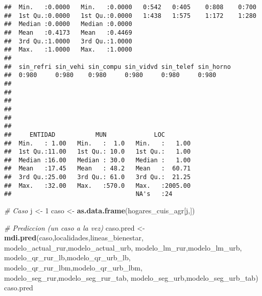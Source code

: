 \documentclass[11pt,]{article}
\newenvironment{Shaded}{\begin{snugshade}}{\end{snugshade}}
\newcommand{\KeywordTok}[1]{\textcolor[rgb]{0.13,0.29,0.53}{\textbf{#1}}}
\newcommand{\DecValTok}[1]{\textcolor[rgb]{0.00,0.00,0.81}{#1}}
\newcommand{\StringTok}[1]{\textcolor[rgb]{0.31,0.60,0.02}{#1}}
\newcommand{\CommentTok}[1]{\textcolor[rgb]{0.56,0.35,0.01}{\textit{#1}}}
\newcommand{\NormalTok}[1]{#1}
\begin{document}
\begin{verbatim}
##  Min.   :0.0000   Min.   :0.0000   0:542   0:405    0:808    0:700      
##  1st Qu.:0.0000   1st Qu.:0.0000   1:438   1:575    1:172    1:280      
##  Median :0.0000   Median :0.0000                                        
##  Mean   :0.4173   Mean   :0.4469                                        
##  3rd Qu.:1.0000   3rd Qu.:1.0000                                        
##  Max.   :1.0000   Max.   :1.0000                                        
##                                                                         
##  sin_refri sin_vehi sin_compu sin_vidvd sin_telef sin_horno
##  0:980     0:980    0:980     0:980     0:980     0:980    
##                                                            
##                                                            
##                                                            
##                                                            
##                                                            
##                                                            
##     ENTIDAD           MUN             LOC         
##  Min.   : 1.00   Min.   :  1.0   Min.   :   1.00  
##  1st Qu.:11.00   1st Qu.: 10.0   1st Qu.:   1.00  
##  Median :16.00   Median : 30.0   Median :   1.00  
##  Mean   :17.45   Mean   : 48.2   Mean   :  60.71  
##  3rd Qu.:25.00   3rd Qu.: 61.0   3rd Qu.:  21.25  
##  Max.   :32.00   Max.   :570.0   Max.   :2005.00  
##                                  NA's   :24
\end{verbatim}

\begin{Shaded}
\begin{Highlighting}[]
\CommentTok{# Caso}
\NormalTok{j <-}\StringTok{ }\DecValTok{1}
\NormalTok{caso <-}\StringTok{ }\KeywordTok{as.data.frame}\NormalTok{(hogares_cuis_agr[j,])}

\CommentTok{# Prediccion (un caso a la vez)}
\NormalTok{caso.pred <-}\StringTok{ }\KeywordTok{mdi.pred}\NormalTok{(caso,localidades,lineas_bienestar,}
\NormalTok{                      modelo_actual_rur,modelo_actual_urb, }
\NormalTok{                      modelo_lm_rur,modelo_lm_urb,}
\NormalTok{                      modelo_qr_rur_lb,modelo_qr_urb_lb, }
\NormalTok{                      modelo_qr_rur_lbm,modelo_qr_urb_lbm,}
\NormalTok{                      modelo_seg_rur,modelo_seg_rur_tab,}
\NormalTok{                      modelo_seg_urb,modelo_seg_urb_tab)}
\NormalTok{caso.pred}
\end{Highlighting}
\end{Shaded}
\end{document}

